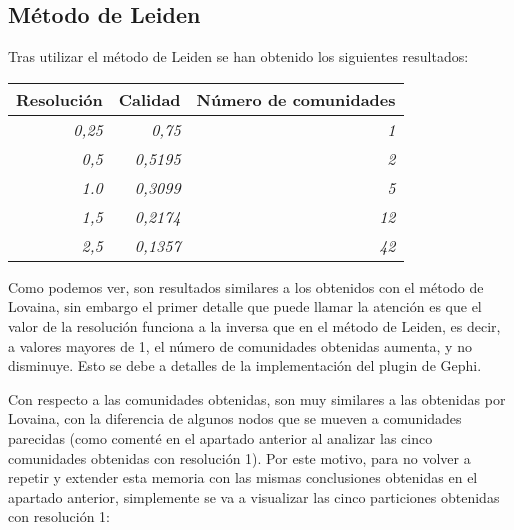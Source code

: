 \newpage

\subsection{Método de Leiden}

Tras utilizar el método de Leiden se han obtenido los siguientes resultados:

\begin{table}[H]
\centering
\begin{tabular}{|r|r|r|}
\hline
\multicolumn{1}{|c|}{\textbf{Resolución}} & \multicolumn{1}{c|}{\textbf{Calidad}} & \multicolumn{1}{c|}{\textbf{Número de comunidades}} \\ \hline
\textit{0,25}                             & \textit{0,75}                         & \textit{1}                                          \\ \hline
\textit{0,5}                              & \textit{0,5195}                       & \textit{2}                                          \\ \hline
\textit{1.0}                              & \textit{0,3099}                       & \textit{5}                                          \\ \hline
\textit{1,5}                              & \textit{0,2174}                       & \textit{12}                                         \\ \hline
\textit{2,5}                              & \textit{0,1357}                       & \textit{42}                                         \\ \hline
\end{tabular}
\end{table}

Como podemos ver, son resultados similares a los obtenidos con el método de Lovaina, sin embargo el primer detalle que puede llamar la atención es que el valor de la resolución funciona a la inversa que en el método de Leiden, es decir, a valores mayores de 1, el número de comunidades obtenidas aumenta, y no disminuye. Esto se debe a detalles de la implementación del plugin de Gephi.

Con respecto a las comunidades obtenidas, son muy similares a las obtenidas por Lovaina, con la diferencia de algunos nodos que se mueven a comunidades parecidas (como comenté en el apartado anterior al analizar las cinco comunidades obtenidas con resolución 1). Por este motivo, para no volver a repetir y extender esta memoria con las mismas conclusiones obtenidas en el apartado anterior, simplemente se va a visualizar las cinco particiones obtenidas con resolución 1:

